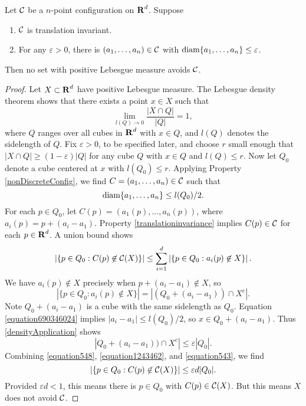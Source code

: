 \begin{theorem}
	Let $\operatorname{\mathcal{C}}$ be a $n$-point configuration on $\operatorname{\mathbf{R}}^d$. Suppose
	\begin{enumerate}
		\item \label{translationinvariance} $\operatorname{\mathcal{C}}$ is translation invariant.
		\item \label{nonDiscreteConfig} For any $\varepsilon > 0$, there is $(a_1, \dots, a_n) \in \operatorname{\mathcal{C}}$ with $\operatorname{\text{diam}} \{ a_1, \dots, a_n \} \leq \varepsilon$.
	\end{enumerate}
	Then no set with positive Lebesgue measure avoids $\operatorname{\mathcal{C}}$.
\end{theorem}
\begin{proof}
	Let $X \subset \operatorname{\mathbf{R}}^d$ have positive Lebesgue measure. The Lebesgue density theorem shows that there exists a point $x \in X$ such that
	\begin{equation} \label{densityApplication} \lim_{l(Q) \to 0} \frac{|X \cap Q|}{|Q|} = 1, \end{equation}
	where $Q$ ranges over all cubes in $\operatorname{\mathbf{R}}^d$ with $x \in Q$, and $l(Q)$ denotes the sidelength of $Q$. Fix $\varepsilon > 0$, to be specified later, and choose $r$ small enough that $|X \cap Q| \geq (1 - \varepsilon) |Q|$ for any cube $Q$ with $x \in Q$ and $l(Q) \leq r$. Now let $Q_0$ denote a cube centered at $x$ with $l(Q_0) \leq r$. Applying Property \ref{nonDiscreteConfig}, we find $C = (a_1, \dots, a_n) \in \operatorname{\mathcal{C}}$ such that
	\begin{equation} \label{equation690346024} \operatorname{\text{diam}} \{ a_1, \dots, a_n \} \leq l(Q_0)/2. \end{equation}
	For each $p \in Q_0$, let $C(p) = (a_1(p), \dots, a_n(p))$, where $a_i(p) = p + (a_i - a_1)$. Property \ref{translationinvariance} implies $C(p) \in \operatorname{\mathcal{C}}$ for each $p \in \operatorname{\mathbf{R}}^d$. A union bound shows
	\begin{equation} \label{equation548} \left| \{ p \in Q_0 : C(p) \not \in \operatorname{\mathcal{C}}(X) \} \right| \leq \sum_{i = 1}^d \left| \{ p \in Q_0 : a_i(p) \not \in X \} \right|.
	\end{equation}
	We have $a_i(p) \not \in X$ precisely when $p + (a_i - a_1) \not \in X$, so
	\begin{equation} \label{equation1243462}
		|\{ p \in Q_0 : a_i(p) \not \in X \}| = |(Q_0 + (a_i - a_1)) \cap X^c|.
	\end{equation}
	Note $Q_0 + (a_i - a_1)$ is a cube with the same sidelength as $Q_0$. Equation \eqref{equation690346024} implies $|a_i - a_1| \leq l(Q_0)/2$, so $x \in Q_0 + (a_i - a_1)$. Thus \eqref{densityApplication} shows
	\begin{equation} \label{equation543} |Q_0 + (a_i - a_1)) \cap X^c| \leq \varepsilon |Q_0|. \end{equation}
	Combining \eqref{equation548}, \eqref{equation1243462}, and \eqref{equation543}, we find
	\[ \left| \{ p \in Q_0 : C(p) \not \in \operatorname{\mathcal{C}}(X) \} \right| \leq \varepsilon d |Q_0|. \]
	Provided $\varepsilon d < 1$, this means there is $p \in Q_0$ with $C(p) \in \operatorname{\mathcal{C}}(X)$. But this means $X$ does not avoid $\operatorname{\mathcal{C}}$.
\end{proof}

